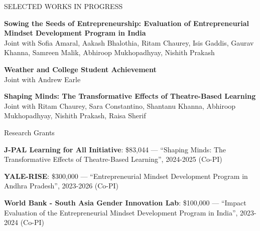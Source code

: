 \documentclass{resume} %
\begin{document}


\begin{rSection}{SELECTED WORKS IN PROGRESS}
\vspace{.5em}


{\bf Sowing the Seeds of Entrepreneurship: Evaluation of Entrepreneurial Mindset Development Program in India}\\
Joint with Sofia Amaral, Aakash Bhalothia, Ritam Chaurey, Isis Gaddis, Gaurav Khanna, Samreen Malik, Abhiroop Mukhopadhyay, Nishith Prakash 

\vspace{.5em}

{\bf Weather and College Student Achievement}\\
Joint with Andrew Earle


\vspace{.5em}


{\bf Shaping Minds: The Transformative Effects of Theatre-Based Learning}\\
Joint with Ritam Chaurey, Sara Constantino, Shantanu Khanna, Abhiroop Mukhopadhyay, Nishith Prakash, Raisa Sherif


\end{rSection}


\begin{rSection}{Research Grants}
	\begin{rSubsection}{}{}{}{}
		\item[] \textbf{J-PAL Learning for All Initiative}: \$83,044 --- ``Shaping Minds: The Transformative Effects of Theatre-Based Learning'', 2024-2025 (Co-PI) \\
		
		\item[] \textbf{YALE-RISE}: \$300,000 --- ``Entrepreneurial Mindset Development Program in Andhra Pradesh'', 2023-2026  (Co-PI) \\
		
		\item[] \textbf{World Bank - South Asia Gender Innovation Lab}: \$100,000 --- ``Impact Evaluation of the Entrepreneurial Mindset Development Program in India'', 2023-2024 (Co-PI) 
		
	\end{rSubsection}
\end{rSection}


\end{document}
